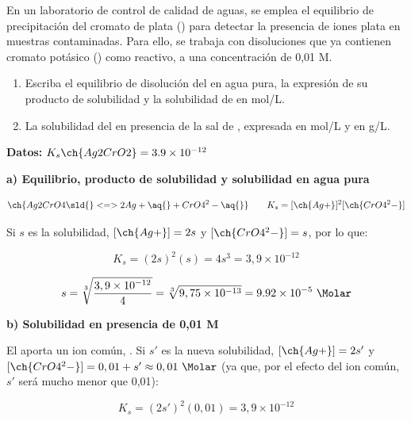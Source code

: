 \begin{exerciseEVAU}
    En un laboratorio de control de calidad de aguas, se emplea el equilibrio de precipitación del cromato de
    plata () para detectar la presencia de iones plata en muestras contaminadas. Para ello, se trabaja
    con disoluciones que ya contienen cromato potásico () como reactivo, a una concentración de 0,01
    M.
    \begin{enumerate}[label=\letraminuscula]
    \item Escriba el equilibrio de disolución del  en agua pura, la expresión de su producto de
    solubilidad y la solubilidad de  en mol/L.
    \item  La solubilidad del  en presencia de la sal de , expresada en mol/L y en g/L.
    \end{enumerate}
    \textbf{Datos:} \( K_s \ch{Ag2CrO2} = \num{3.9e-12} \)
    \begin{solu}

        \textbf{a) Equilibrio, producto de solubilidad y solubilidad en agua pura}

        \begin{equation*}
            \ch{Ag2CrO4 \sld{} <=> 2 Ag+ \aq{} + CrO4^2- \aq{}} \qquad K_s = [\ch{Ag+}]^2 [\ch{CrO4^2-}]
        \end{equation*}

        Si \(s\) es la solubilidad, \([\ch{Ag+}] = 2s\) y \([\ch{CrO4^2-}] = s\), por lo que:

        \begin{equation*}
            K_s = (2s)^2 (s) = 4 s^3 = 3,9 \times 10^{-12}
        \end{equation*}

        \begin{equation*}
            s = \sqrt[3]{\dfrac{3,9 \times 10^{-12}}{4}} = \sqrt[3]{9,75 \times 10^{-13}} = \num{9.92e-5} \ \si{\Molar}
        \end{equation*}

        \textbf{b) Solubilidad en presencia de  0,01 M}

        El  aporta un ion común, . Si \(s'\) es la nueva solubilidad, \([\ch{Ag+}] = 2s'\) y \([\ch{CrO4^2-}] = 0,01 + s' \approx 0,01\ \si{\Molar}\) (ya que, por el efecto del ion común, \(s'\) será mucho menor que 0,01):

        \begin{equation*}
            K_s = (2s')^2 (0,01) = 3,9 \times 10^{-12}
        \end{equation*}


\end{solu}
\end{exerciseEVAU}
